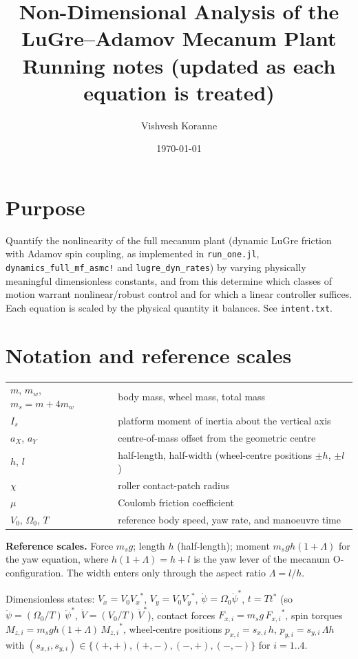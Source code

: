 \documentclass[11pt]{article}
\title{Non-Dimensional Analysis of the LuGre--Adamov Mecanum Plant\\
\large Running notes (updated as each equation is treated)}
\author{Vishvesh Koranne}
\date{\today}
\newcommand{\st}[1]{{#1}^{*}}
\begin{document}
\maketitle

\section*{Purpose}
Quantify the nonlinearity of the full mecanum plant (dynamic LuGre friction with
Adamov spin coupling, as implemented in \texttt{run\_one.jl},
\texttt{dynamics\_full\_mf\_asmc!} and \texttt{lugre\_dyn\_rates}) by varying
physically meaningful dimensionless constants, and from this determine which
classes of motion warrant nonlinear/robust control and for which a linear
controller suffices. Each equation is scaled by the physical quantity it
balances. See \texttt{intent.txt}.

\section{Notation and reference scales}
\begin{tabular}{@{}ll@{}}
$m$, $m_w$, $m_s = m + 4m_w$ & body mass, wheel mass, total mass \\
$I_s$ & platform moment of inertia about the vertical axis \\
$a_X$, $a_Y$ & centre-of-mass offset from the geometric centre \\
$h$, $l$ & half-length, half-width (wheel-centre positions $\pm h$, $\pm l$) \\
$\chi$ & roller contact-patch radius \\
$\mu$ & Coulomb friction coefficient \\
$V_0$, $\Omega_0$, $T$ & reference body speed, yaw rate, and manoeuvre time \\
\end{tabular}

\medskip
\textbf{Reference scales.} Force $m_s g$; length $h$ (half-length); moment
$m_s g h(1+\Lambda)$ for the yaw equation, where $h(1+\Lambda) = h + l$ is the yaw
lever of the mecanum O-configuration. The width enters only through the aspect
ratio $\Lambda = l/h$.

\medskip
Dimensionless states: $V_x = V_0\st{V_x}$, $V_y = V_0\st{V_y}$,
$\dot\psi = \Omega_0\st{\dot\psi}$, $t = T\st{t}$ (so
$\ddot\psi = (\Omega_0/T)\,\st{\ddot\psi}$, $\dot V = (V_0/T)\,\st{\dot V}$),
contact forces $F_{x,i} = m_s g\,\st{F_{x,i}}$, spin torques
$M_{z,i} = m_s g h(1+\Lambda)\,\st{M_{z,i}}$, wheel-centre positions
$p_{x,i} = s_{x,i}\,h$, $p_{y,i} = s_{y,i}\,\Lambda h$ with
$(s_{x,i}, s_{y,i}) \in \{(+,+),(+,-),(-,+),(-,-)\}$ for $i = 1..4$.
\end{document}
